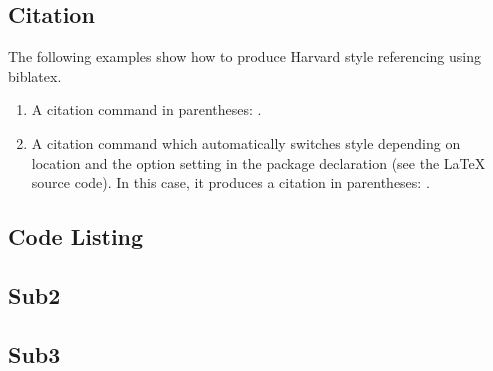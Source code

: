 \documentclass[a4paper, 12pt]{article}
\begin{document}
\subsection{Citation}


The following examples show how to produce Harvard style referencing using biblatex.

\begin{enumerate}
	\item A citation command in parentheses: \parencite{Smith:2012qr}.
	\item A citation command which automatically switches style depending on location and the option setting in the package declaration (see the LaTeX source code). In this case, it produces a citation in parentheses: \autocite{Other:2014ab}.
\end{enumerate}

\pagebreak

\subsection{Code Listing}


\vspace{1cm}


\vspace{1cm}

\subsection{Sub2}


\subsection{Sub3}



\pagebreak
\end{document}
